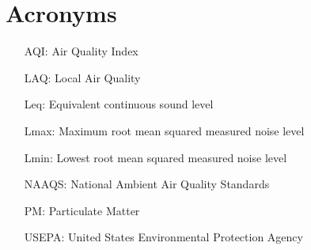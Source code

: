 \documentclass[12pt, oneside]{book}
\begin{document}
\chapter{Acronyms}

\begin{itemize}[leftmargin=2cm]
\item[AQI:] Air Quality Index 
\item[LAQ:] Local Air Quality
\item[Leq:] Equivalent continuous sound level
\item[Lmax:] Maximum root mean squared measured noise level
\item[Lmin:] Lowest root mean squared measured noise level
\item[NAAQS:] National Ambient Air Quality Standards
\item[PM:] Particulate Matter
\item[USEPA:] United States Environmental Protection Agency
\end{itemize}


\appendix
\end{document}
